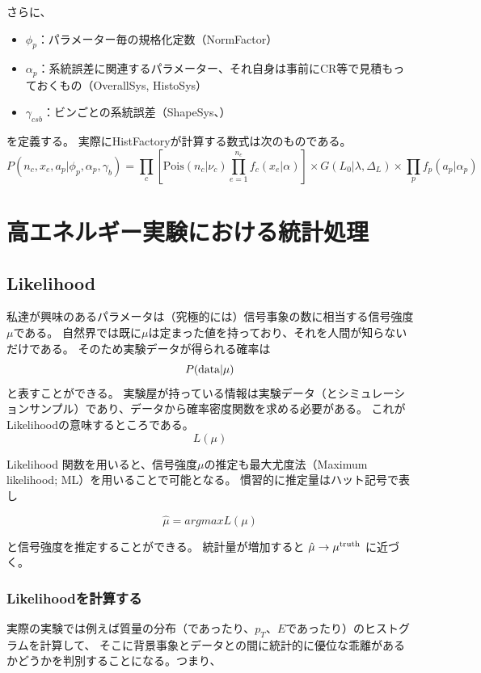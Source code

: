 \documentclass[a4paper,uplatex]{jsreport}
\begin{document}
\begin{euation}
\begin{euation}
\begin{euation}
\begin{euation}
さらに、
\begin{itemize}
  \item ${\phi_p}$：パラメーター毎の規格化定数（NormFactor）
  \item ${\alpha_p}$：系統誤差に関連するパラメーター、それ自身は事前にCR等で見積もっておくもの（OverallSys, HistoSys）
  \item ${\gamma_{csb}}$：ビンごとの系統誤差（ShapeSys、）
\end{itemize}
を定義する。 実際にHistFactoryが計算する数式は次のものである。
\begin{equation}
  P(n_c,x_e,a_p|\phi_p,\alpha_p,\gamma_b) = \prod_{c}\left[\mathrm{Pois}(n_c|\nu_c) \prod_{e=1}^{n_c}f_c(x_e|\alpha) \right]
  \times G(L_0|\lambda,\Delta_L)
  \times \prod_{p} f_p(a_p|\alpha_p)
\end{equation}


\chapter{高エネルギー実験における統計処理}
\section{Likelihood}
私達が興味のあるパラメータは（究極的には）信号事象の数に相当する信号強度$\mu$である。
自然界では既に$\mu$は定まった値を持っており、それを人間が知らないだけである。
そのため実験データが得られる確率は
\begin{equation}
P(\rm{data}|\mu)
\end{equation}
と表すことができる。
実験屋が持っている情報は実験データ（とシミュレーションサンプル）であり、データから確率密度関数を求める必要がある。
これがLikelihoodの意味するところである。
\begin{equation}
L(\mu)
\end{equation}

Likelihood 関数を用いると、信号強度$\mu$の推定も最大尤度法（Maximum likelihood; ML）を用いることで可能となる。
慣習的に推定量はハット記号で表し

\begin{equation}
\hat{\mu} = arg max L(\mu)
\end{equation}

と信号強度を推定することができる。
統計量が増加すると $\hat{\mu}\to\mu^{\rm{truth}}$ に近づく。

\subsection{Likelihoodを計算する}
実際の実験では例えば質量の分布（であったり、$p_T$、$E$であったり）のヒストグラムを計算して、
そこに背景事象とデータとの間に統計的に優位な乖離があるかどうかを判別することになる。つまり、


\end{euation}
\end{euation}
\end{euation}
\end{euation}
\end{document}
